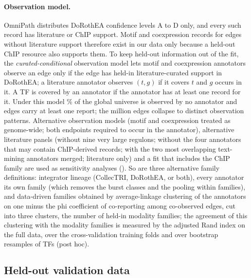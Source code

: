 \paragraph{Observation model.}
OmniPath distributes DoRothEA confidence levels A to D only, and every such record has literature or ChIP support.
Motif and coexpression records for edges without literature support therefore exist in our data only because a held-out ChIP resource also supports them.
To keep held-out information out of the fit, the \emph{curated-conditional} observation model lets motif and coexpression annotators observe an edge only if the edge has held-in literature-curated support in DoRothEA; a literature annotator observes $(t,g)$ if it covers $t$ and $g$ occurs in it.
A TF is covered by an annotator if the annotator has at least one record for it.
Under this model \nGlobUnobsPct{}\% of the global universe is observed by no annotator and \nGlobReported{} edges carry at least one report; the \nGlobEdgesMio{} million edges collapse to \nGlobPatterns{} distinct observation patterns.
Alternative observation models (motif and coexpression treated as genome-wide; both endpoints required to occur in the annotator), alternative literature panels (without nine very large regulons; without the four annotators that may contain ChIP-derived records; with the two most overlapping text-mining annotators merged; literature only) and a fit that includes the ChIP family are used as sensitivity analyses ().
So are three alternative family definitions: integrator lineage (CollecTRI, DoRothEA, or both), every annotator its own family (which removes the burst classes and the pooling within families), and data-driven families obtained by average-linkage clustering of the annotators on one minus the phi coefficient of co-reporting among co-observed edges, cut into three clusters, the number of held-in modality families; the agreement of this clustering with the modality families is measured by the adjusted Rand index on the full data, over the cross-validation training folds and over bootstrap resamples of TFs (post hoc).



\subsection{Held-out validation data}\label{sec:data-heldout}
